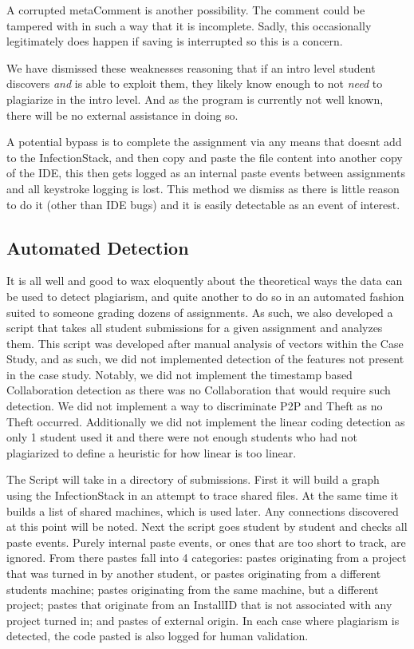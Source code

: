 \documentclass[10pt]{article}
\newcommand{\installID}{InstallID\xspace}
\newcommand{\metaComment}{metaComment\xspace}
\newcommand{\infectionStack}{InfectionStack\xspace}
\begin{document}
A corrupted \metaComment is another possibility.  The comment could be tampered with in such a way that it is incomplete.  Sadly, this occasionally legitimately does happen if saving is interrupted so this is a concern.                     	

We have dismissed these weaknesses reasoning that if an intro level student discovers \textit{and} is able to exploit them, they likely know enough to not \textit{need} to plagiarize in the intro level.  And as the program is currently not well known, there will be no external assistance in doing so.

A potential bypass is to complete the assignment via any means that doesnt add to the \infectionStack, and then copy and paste the file content into another copy of the IDE, this then gets logged as an internal paste events between assignments and all keystroke logging is lost.  This method we dismiss as there is little reason to do it (other than IDE bugs) and it is easily detectable as an event of interest.
\subsection{Automated Detection}

It is all well and good to wax eloquently about the theoretical ways the data can be used to detect plagiarism, and quite another to do so in an automated fashion suited to someone grading dozens of assignments.  As such, we also developed a script that takes all student submissions for a given assignment and analyzes them.  This script was developed after manual analysis of vectors within the Case Study, and as such, we did not implemented detection of the features not present in the case study.  Notably, we did not implement the timestamp based Collaboration detection as there was no Collaboration that would require such detection.  We did not implement a way to discriminate P2P and Theft as no Theft occurred. Additionally we did not implement the linear coding detection as only 1 student used it and there were not enough students who had not plagiarized to define a heuristic for how linear is too linear.  

The Script will take in a directory of submissions.  First it will build a graph using the \infectionStack in an attempt to trace shared files.  At the same time it builds a list of shared machines, which is used later.  Any connections discovered at this point will be noted.  Next the script goes student by student and checks all paste events.  Purely internal paste events, or ones that are too short to track, are ignored.  From there pastes fall into 4 categories:  pastes originating from a project that was turned in by another student, or pastes originating from a different students machine; pastes originating from the same machine, but a different project; pastes that originate from an \installID that is not associated with any project turned in; and pastes of external origin.  In each case where plagiarism is detected, the code pasted is also logged for human validation.
\end{document}
